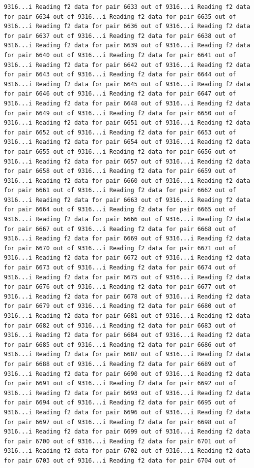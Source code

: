 \documentclass[
]{article}
\begin{document}
\begin{verbatim}
9316...i Reading f2 data for pair 6633 out of 9316...i Reading f2 data for pair 6634 out of 9316...i Reading f2 data for pair 6635 out of 9316...i Reading f2 data for pair 6636 out of 9316...i Reading f2 data for pair 6637 out of 9316...i Reading f2 data for pair 6638 out of 9316...i Reading f2 data for pair 6639 out of 9316...i Reading f2 data for pair 6640 out of 9316...i Reading f2 data for pair 6641 out of 9316...i Reading f2 data for pair 6642 out of 9316...i Reading f2 data for pair 6643 out of 9316...i Reading f2 data for pair 6644 out of 9316...i Reading f2 data for pair 6645 out of 9316...i Reading f2 data for pair 6646 out of 9316...i Reading f2 data for pair 6647 out of 9316...i Reading f2 data for pair 6648 out of 9316...i Reading f2 data for pair 6649 out of 9316...i Reading f2 data for pair 6650 out of 9316...i Reading f2 data for pair 6651 out of 9316...i Reading f2 data for pair 6652 out of 9316...i Reading f2 data for pair 6653 out of 9316...i Reading f2 data for pair 6654 out of 9316...i Reading f2 data for pair 6655 out of 9316...i Reading f2 data for pair 6656 out of 9316...i Reading f2 data for pair 6657 out of 9316...i Reading f2 data for pair 6658 out of 9316...i Reading f2 data for pair 6659 out of 9316...i Reading f2 data for pair 6660 out of 9316...i Reading f2 data for pair 6661 out of 9316...i Reading f2 data for pair 6662 out of 9316...i Reading f2 data for pair 6663 out of 9316...i Reading f2 data for pair 6664 out of 9316...i Reading f2 data for pair 6665 out of 9316...i Reading f2 data for pair 6666 out of 9316...i Reading f2 data for pair 6667 out of 9316...i Reading f2 data for pair 6668 out of 9316...i Reading f2 data for pair 6669 out of 9316...i Reading f2 data for pair 6670 out of 9316...i Reading f2 data for pair 6671 out of 9316...i Reading f2 data for pair 6672 out of 9316...i Reading f2 data for pair 6673 out of 9316...i Reading f2 data for pair 6674 out of 9316...i Reading f2 data for pair 6675 out of 9316...i Reading f2 data for pair 6676 out of 9316...i Reading f2 data for pair 6677 out of 9316...i Reading f2 data for pair 6678 out of 9316...i Reading f2 data for pair 6679 out of 9316...i Reading f2 data for pair 6680 out of 9316...i Reading f2 data for pair 6681 out of 9316...i Reading f2 data for pair 6682 out of 9316...i Reading f2 data for pair 6683 out of 9316...i Reading f2 data for pair 6684 out of 9316...i Reading f2 data for pair 6685 out of 9316...i Reading f2 data for pair 6686 out of 9316...i Reading f2 data for pair 6687 out of 9316...i Reading f2 data for pair 6688 out of 9316...i Reading f2 data for pair 6689 out of 9316...i Reading f2 data for pair 6690 out of 9316...i Reading f2 data for pair 6691 out of 9316...i Reading f2 data for pair 6692 out of 9316...i Reading f2 data for pair 6693 out of 9316...i Reading f2 data for pair 6694 out of 9316...i Reading f2 data for pair 6695 out of 9316...i Reading f2 data for pair 6696 out of 9316...i Reading f2 data for pair 6697 out of 9316...i Reading f2 data for pair 6698 out of 9316...i Reading f2 data for pair 6699 out of 9316...i Reading f2 data for pair 6700 out of 9316...i Reading f2 data for pair 6701 out of 9316...i Reading f2 data for pair 6702 out of 9316...i Reading f2 data for pair 6703 out of 9316...i Reading f2 data for pair 6704 out of 
\end{verbatim}
\end{document}
